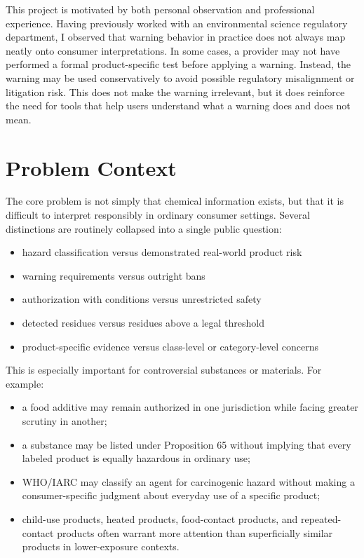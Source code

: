 \documentclass[11pt]{article}
\begin{document}
This project is motivated by both personal observation and professional experience. Having previously worked with an environmental science regulatory department, I observed that warning behavior in practice does not always map neatly onto consumer interpretations. In some cases, a provider may not have performed a formal product-specific test before applying a warning. Instead, the warning may be used conservatively to avoid possible regulatory misalignment or litigation risk. This does not make the warning irrelevant, but it does reinforce the need for tools that help users understand what a warning does and does not mean.

\section{Problem Context}

The core problem is not simply that chemical information exists, but that it is difficult to interpret responsibly in ordinary consumer settings. Several distinctions are routinely collapsed into a single public question:

\begin{itemize}[leftmargin=1.5em]
\item hazard classification versus demonstrated real-world product risk
\item warning requirements versus outright bans
\item authorization with conditions versus unrestricted safety
\item detected residues versus residues above a legal threshold
\item product-specific evidence versus class-level or category-level concerns
\end{itemize}

This is especially important for controversial substances or materials. For example:

\begin{itemize}[leftmargin=1.5em]
\item a food additive may remain authorized in one jurisdiction while facing greater scrutiny in another;
\item a substance may be listed under Proposition 65 without implying that every labeled product is equally hazardous in ordinary use;
\item WHO/IARC may classify an agent for carcinogenic hazard without making a consumer-specific judgment about everyday use of a specific product;
\item child-use products, heated products, food-contact products, and repeated-contact products often warrant more attention than superficially similar products in lower-exposure contexts.
\end{itemize}
\end{document}
